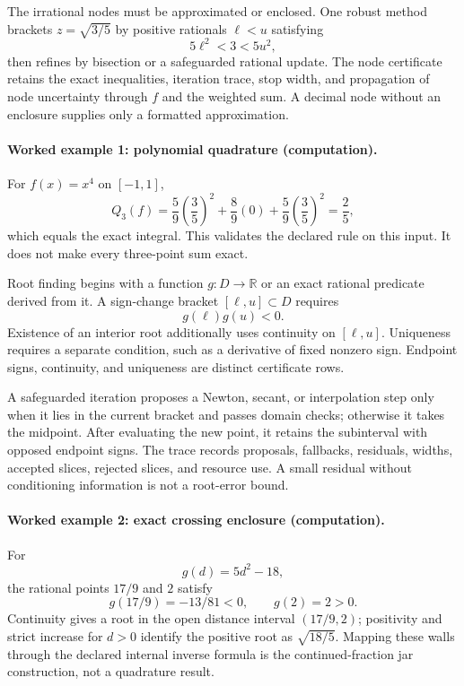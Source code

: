The irrational nodes must be approximated or enclosed.  One robust method brackets \(z=\sqrt{3/5}\) by positive
rationals \(\ell<u\) satisfying
\[
                         5\ell^2<3<5u^2,
\]
then refines by bisection or a safeguarded rational update.  The node certificate retains the exact inequalities,
iteration trace, stop width, and propagation of node uncertainty through \(f\) and the weighted sum.  A decimal node
without an enclosure supplies only a formatted approximation.

\paragraph{Worked example 1: polynomial quadrature (computation).}
For \(f(x)=x^4\) on \([-1,1]\),
\[
Q_3(f)=\frac{5}{9}\left(\frac35\right)^2+
\frac89(0)+\frac59\left(\frac35\right)^2=\frac25,
\]
which equals the exact integral.  This validates the declared rule on this input.  It does not make every three-point
sum exact.

Root finding begins with a function \(g:D\to\mathbb R\) or an exact rational predicate derived from it.  A sign-change
bracket \([\ell,u]\subset D\) requires
\[
                         g(\ell)g(u)<0.
\]
Existence of an interior root additionally uses continuity on \([\ell,u]\).  Uniqueness requires a separate condition,
such as a derivative of fixed nonzero sign.  Endpoint signs, continuity, and uniqueness are distinct certificate rows.

A safeguarded iteration proposes a Newton, secant, or interpolation step only when it lies in the current bracket and
passes domain checks; otherwise it takes the midpoint.  After evaluating the new point, it retains the subinterval
with opposed endpoint signs.  The trace records proposals, fallbacks, residuals, widths, accepted slices, rejected
slices, and resource use.  A small residual without conditioning information is not a root-error bound.

\paragraph{Worked example 2: exact crossing enclosure (computation).}
For
\[
                         g(d)=5d^2-18,
\]
the rational points \(17/9\) and \(2\) satisfy
\[
                         g(17/9)=-13/81<0,\qquad g(2)=2>0.
\]
Continuity gives a root in the open distance interval \((17/9,2)\); positivity and strict increase for \(d>0\)
identify the positive root as \(\sqrt{18/5}\).  Mapping these walls through the declared internal inverse formula is
the continued-fraction jar construction, not a quadrature result.

